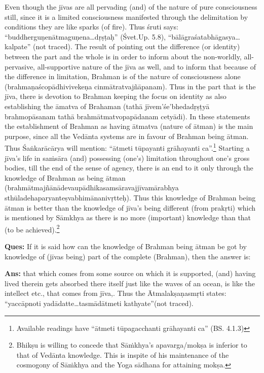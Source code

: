 Even though the jīvas are all pervading (and) of the nature of pure consciousness still, since it is a limited consciousness manifested through the delimitation by conditions they are like sparks (of fire). Thus śruti says: “buddherguṇenātmaguṇena…dṛṣṭaḥ” (Śvet.Up. 5.8), “bālāgra\-śatabhāgasya…kalpate” (not traced). The result of pointing out the difference (or identity) between the part and the whole is in order to inform about the non-worldly, all-pervasive, all-supportive nature of the jīva as well, and to inform that because of the difference in limitation, Brahman is of the nature of consciousness alone (brahmaṇaścopādhivivekeṇa cinmātratvajñāpanam). Thus in the part that is the jīva, there is devotion to Brahman keeping the focus on identity as also establishing the āmatva of Brahaman (tathā jīvem’śe’bhedadṛṣṭyā brahmopāsanam tathā brahmātmatvopapādanam cetyādi). In these statements the  establishment of Brahman as having ātmatva (nature of ātman) is the main purpose, since all the Vedānta systems are in favour of Brahman being ātman. Thus Śaṅkarācārya  will mention: “ātmeti tūpayanti grāhayanti ca”.\footnote{Available readings have “ātmeti tūpagacchanti grāhayanti ca” (BS. 4.1.3)}   Starting a jīva’s life in saṁsāra (and) possessing (one’s) limitation throughout one’s gross bodies, till the end of the sense of agency, there is an end to it only through the knowledge of Brahman as being ātman (brahmātmajñānādevaupādhikasamsāravajjīvamārabhya sthūladehaparyanteṣvabhimānanivṛtteḥ). Thus this knowledge of Brahman being ātman is better than the knowledge of jīva’s being different (from prakṛti) which is mentioned by Sāmkhya as there is no more (important) knowledge than that (to be achieved).\footnote{Bhikṣu is willing to concede that Sāṁkhya’s apavarga/mokṣa is inferior to that of Vedānta knowledge. This is inspite of his maintenance of the cosmogony of Sāṁkhya and the Yoga sādhana for attaining mokṣa.}  

\textbf{Ques:} If it is said how can the knowledge of Brahman being ātman be got by knowledge of (jīvas being) part of the complete (Brahman), then the answer is:

\textbf{Ans:} that which comes from some source on which it is supported, (and) having lived therein gets absorbed there itself just like the waves of an ocean, is like the intellect etc., that comes from jīva,. Thus the Ātmalakṣaṇasmṛti states: “yaccāpnoti yadādatte…tasmādātmeti kathyate”(not traced).

